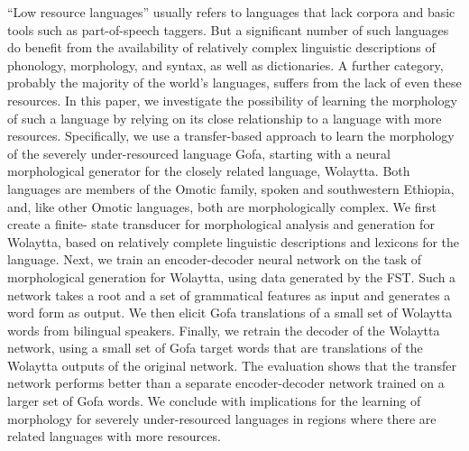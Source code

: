 ``Low resource languages'' usually refers to languages that lack corpora and basic tools such as part-of-speech taggers. But a significant number of such languages do benefit from the availability of relatively complex linguistic descriptions of phonology, morphology, and syntax, as well as dictionaries. A further category, probably the majority of the world's languages, suffers from the lack of even these resources. In this paper, we investigate the possibility of learning the morphology of such a language by relying on its close relationship to a language with more resources. Specifically, we use a transfer-based approach to learn the morphology of the severely under-resourced language Gofa, starting with a neural morphological generator for the closely related language, Wolaytta. Both languages are members of the Omotic family, spoken and southwestern Ethiopia, and, like other Omotic languages, both are morphologically complex. We first create a finite- state transducer for morphological analysis and generation for Wolaytta, based on relatively complete linguistic descriptions and lexicons for the language. Next, we train an encoder-decoder neural network on the task of morphological generation for Wolaytta, using data generated by the FST. Such a network takes a root and a set of grammatical features as input and generates a word form as output. We then elicit Gofa translations of a small set of Wolaytta words from bilingual speakers. Finally, we retrain the decoder of the Wolaytta network, using a small set of Gofa target words that are translations of the Wolaytta outputs of the original network. The evaluation shows that the transfer network performs better than a separate encoder-decoder network trained on a larger set of Gofa words. We conclude with implications for the learning of morphology for severely under-resourced languages in regions where there are related languages with more resources.
